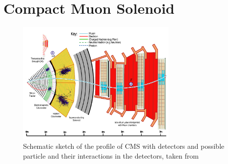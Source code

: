 \section{Compact Muon Solenoid}
\label{sec:section_2_2}


\begin{figure}[ht]
	\centering
	\includegraphics[width=0.7\textwidth]{pictures/CMS.pdf}

	\caption[Profile of CMS detector]{Schematic sketch of the profile of \acs{CMS} with detectors and possible particle and their interactions in the detectors, taken from \cite{PARTICLEFLOW}}
	\label{fig:fig_2_5}
\end{figure}

